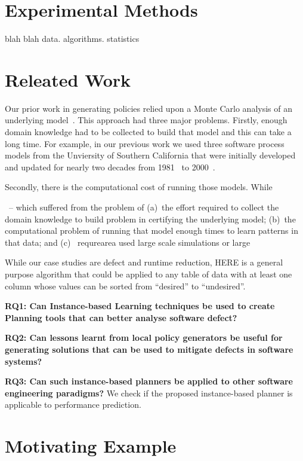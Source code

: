 \documentclass[conference]{IEEEtran}
\begin{document}
\section{Experimental Methods}

blah blah data. algorithms. statistics

\section{Releated Work}

Our prior work in generating policies relied upon a Monte Carlo
analysis of an underlying model~\cite{me07f}. This approach had three major problems.
Firstly, enough domain knowledge had to be collected to build that model
and this can take a long time. For example, in our previous work we used three software process models from
the Unviersity of Southern California that were initially
developed and updated for nearly two decades from 1981~\cite{boehm81} to 2000~\cite{boehm00b}.

Secondly, there is the computational cost of running those models.
While 

~\cite{}-- which suffered from the problem of (a)~the effort required to collect the domain knowledge to build
problem in certifying the underlying model;
 (b)~the computational problem of running that model enough
times to learn patterns in that data; and (c)~ requrearea used large scale simulations or large


While
our case studies are defect and runtime reduction, HERE is a general
purpose algorithm that could be applied to any table of data with at least
one column whose values can be sorted from ``desired'' to ``undesired''.



{\bf RQ1: Can Instance-based Learning techniques be used to create Planning tools that can better analyse software defect?} 


{\bf RQ2: Can lessons learnt from local policy generators be useful for generating solutions that can be used to mitigate defects in software systems?} 

{\bf RQ3: Can such instance-based planners be applied to other software engineering paradigms?}
We check if the proposed instance-based planner is applicable to performance prediction.

\section{Motivating Example}
\end{document}
